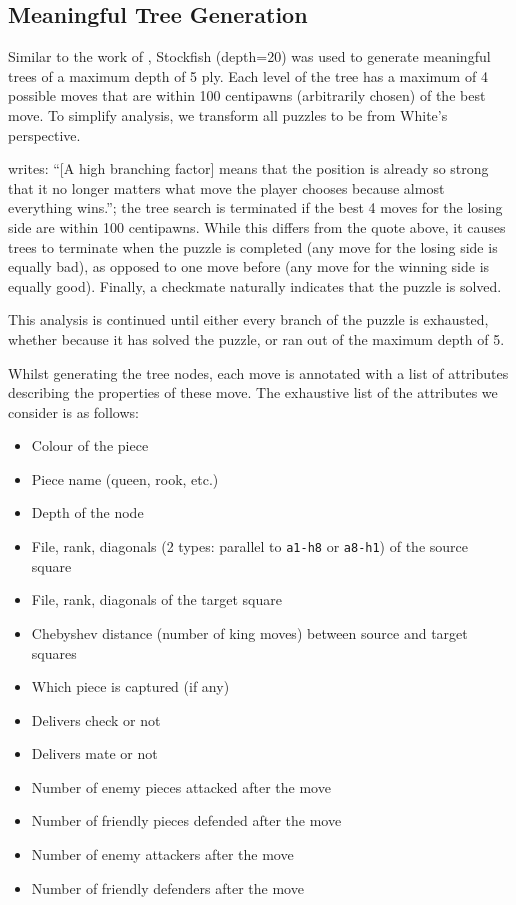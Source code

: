 \subsection{Meaningful Tree Generation}\label{treeS12}

Similar to the work of \citet{chessTrees}, Stockfish (depth=20) was used to
generate meaningful trees of a maximum depth of 5 ply. Each level of the tree
has a maximum of 4 possible moves that are within 100 centipawns (arbitrarily
chosen) of the best move. To simplify analysis, we transform all puzzles to be
from White's perspective.

\citet{chessTrees} writes: ``[A high branching factor] means that the position
is already so strong that it no longer matters what move the player chooses
because almost everything wins.''; the tree search is terminated if the best 4
moves for the losing side are within 100 centipawns. While this differs from
the quote above, it causes trees to terminate when the puzzle is completed (any
move for the losing side is equally bad), as opposed to one move before (any
move for the winning side is equally good). Finally, a checkmate naturally
indicates that the puzzle is solved. 

This analysis is continued until either every branch of the puzzle is
exhausted, whether because it has solved the puzzle, or ran out of the maximum
depth of 5.

Whilst generating the tree nodes, each move is annotated with a list of
attributes describing the properties of these move. The exhaustive list of the
attributes we consider is as follows:

\begin{itemize}
    \item Colour of the piece
    \item Piece name (queen, rook, etc.\@)
    \item Depth of the node
    \item File, rank, diagonals (2 types: parallel to \texttt{a1-h8} or
        \texttt{a8-h1}) of the source square
    \item File, rank, diagonals of the target square
    \item Chebyshev distance (number of king moves) between source and target
        squares     
    \item Which piece is captured (if any)
    \item Delivers check or not
    \item Delivers mate or not
    \item Number of enemy pieces attacked after the move
    \item Number of friendly pieces defended after the move
    \item Number of enemy attackers after the move
    \item Number of friendly defenders after the move
\end{itemize}

